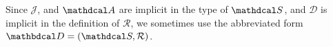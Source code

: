 \documentclass{article}
\theoremstyle{plain}
\theoremstyle{definition}
\theoremstyle{remark}
\newtheorem*{remark}{Remark}
\newcommand\mat[1]{\mathbf{#1}}
\newcommand\Set{\mathbb{S}\mathrm{et}}
\newcommand{\D}{\mathbdcal D} %
\newcommand{\Attrs}{\mathdcal A}
\newcommand{\Idx}{\mathcal J}
\newcommand{\Doms}{{\mathcal D}}
\newcommand{\Rels}{{\mathcal R}}
\newcommand{\sch}{\mathdcal S}%
\newcommand{\arity}{\mathit{ar}}
\begin{document}
\begin{defn}[database]
    
	
	
	
	\smallskip	
	Since $\Idx$, and $\Attrs$ are implicit in the type of $\sch$, and $\Doms$ is implicit in the definition of $\Rels$,
	we sometimes use the abbreviated form $\D = (\sch, \Rels)$. %
\end{defn}
\medskip

\end{document}
